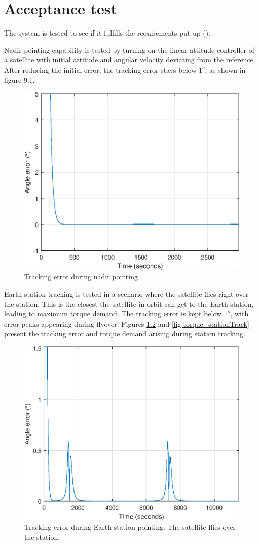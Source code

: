 \chapter{Acceptance test} \label{chap:acceptanceTest}

The system is tested to see if it fulfills the requirements put up ().

Nadir pointing capability is tested by turning on the linear attitude controller of a satellite with initial attitude and angular velocity deviating from the reference. After reducing the initial error, the tracking error stays below $1^o$, as shown in figure 9.1.

\begin{figure}[H]
	\centering
	\includegraphics[width=0.7\linewidth]{figures/angle_error}
	\caption{Tracking error during nadir pointing}
	\label{fig:angle_error}
\end{figure}

Earth station tracking is  tested in a scenario where the satellite flies right over the station. This is the closest the satellite in orbit can get to the Earth station, leading to maximum torque demand. The tracking error is kept below  $1^o$, with error peaks appearing during flyover. Figures \ref{fig:angle_error2} and \ref{fig:torque_stationTrack} present the tracking error and torque demand arising during station tracking.

\begin{figure}[H]
	\centering
	\includegraphics[width=0.7\linewidth]{figures/angle_error_stationTrack}
	\caption{Tracking error during Earth station pointing. The satellite flies over the station.}
	\label{fig:angle_error2}
\end{figure}



